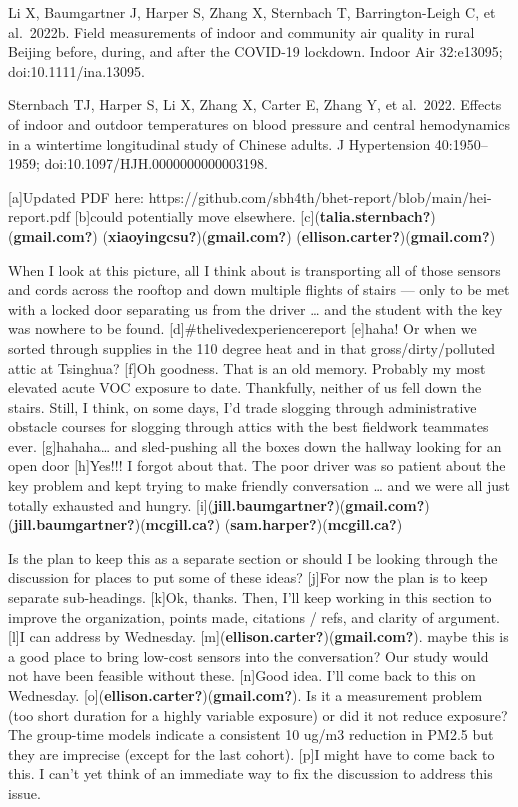\documentclass[
  letterpaper,
  DIV=11,
  numbers=noendperiod]{scrartcl}
\begin{document}
Li X, Baumgartner J, Harper S, Zhang X, Sternbach T, Barrington-Leigh C,
et al.~2022b. Field measurements of indoor and community air quality in
rural Beijing before, during, and after the COVID-19 lockdown. Indoor
Air 32:e13095; doi:10.1111/ina.13095.

Sternbach TJ, Harper S, Li X, Zhang X, Carter E, Zhang Y, et al.~2022.
Effects of indoor and outdoor temperatures on blood pressure and central
hemodynamics in a wintertime longitudinal study of Chinese adults. J
Hypertension 40:1950--1959; doi:10.1097/HJH.0000000000003198.

{[}a{]}Updated PDF here:
https://github.com/sbh4th/bhet-report/blob/main/hei-report.pdf
{[}b{]}could potentially move elsewhere.
{[}c{]}(\textbf{talia.sternbach?})(\textbf{gmail.com?})
(\textbf{xiaoyingcsu?})(\textbf{gmail.com?})
(\textbf{ellison.carter?})(\textbf{gmail.com?})

When I look at this picture, all I think about is transporting all of
those sensors and cords across the rooftop and down multiple flights of
stairs --- only to be met with a locked door separating us from the
driver \ldots{} and the student with the key was nowhere to be found.
{[}d{]}\#thelivedexperiencereport {[}e{]}haha! Or when we sorted through
supplies in the 110 degree heat and in that gross/dirty/polluted attic
at Tsinghua? {[}f{]}Oh goodness. That is an old memory. Probably my most
elevated acute VOC exposure to date. Thankfully, neither of us fell down
the stairs. Still, I think, on some days, I'd trade slogging through
administrative obstacle courses for slogging through attics with the
best fieldwork teammates ever. {[}g{]}hahaha\ldots{} and sled-pushing
all the boxes down the hallway looking for an open door {[}h{]}Yes!!! I
forgot about that. The poor driver was so patient about the key problem
and kept trying to make friendly conversation \ldots{} and we were all
just totally exhausted and hungry.
{[}i{]}(\textbf{jill.baumgartner?})(\textbf{gmail.com?})
(\textbf{jill.baumgartner?})(\textbf{mcgill.ca?})
(\textbf{sam.harper?})(\textbf{mcgill.ca?})

Is the plan to keep this as a separate section or should I be looking
through the discussion for places to put some of these ideas? {[}j{]}For
now the plan is to keep separate sub-headings. {[}k{]}Ok, thanks. Then,
I'll keep working in this section to improve the organization, points
made, citations / refs, and clarity of argument. {[}l{]}I can address by
Wednesday. {[}m{]}(\textbf{ellison.carter?})(\textbf{gmail.com?}). maybe
this is a good place to bring low-cost sensors into the conversation?
Our study would not have been feasible without these. {[}n{]}Good idea.
I'll come back to this on Wednesday.
{[}o{]}(\textbf{ellison.carter?})(\textbf{gmail.com?}). Is it a
measurement problem (too short duration for a highly variable exposure)
or did it not reduce exposure? The group-time models indicate a
consistent 10 ug/m3 reduction in PM2.5 but they are imprecise (except
for the last cohort). {[}p{]}I might have to come back to this. I can't
yet think of an immediate way to fix the discussion to address this
issue.
\end{document}
